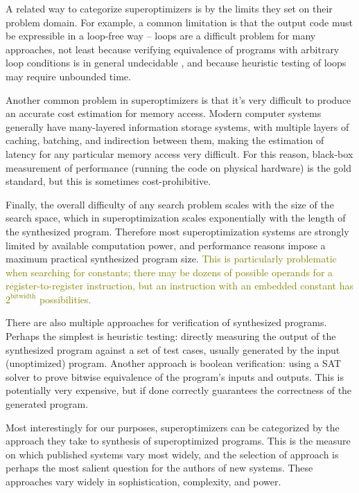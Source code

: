 \documentclass[12pt,twoside]{reedthesis}
\newcommand{\green}[1]{\textcolor{olive}{#1}}
\begin{document}
    A related way to categorize superoptimizers is by the limits they set on their problem domain.
    For example, a common limitation is that the output code must be expressible in a loop-free way
        -- loops are a difficult problem for many approaches,
            not least because verifying equivalence of programs with arbitrary loop conditions is in general undecidable \cite{turing1937tm} \cite{sipser2012computation},
            and because heuristic testing of loops may require unbounded time.

    Another common problem in superoptimizers is that it's very difficult to produce an accurate cost estimation for memory access.
        Modern computer systems generally have many-layered information storage systems, with multiple layers of caching, batching, and indirection between them, making the estimation of latency for any particular memory access very difficult.
        For this reason, black-box measurement of performance (running the code on physical hardware) is the gold standard, but this is sometimes cost-prohibitive.

    Finally, the overall difficulty of any search problem scales with the size of the search space, which in superoptimization scales exponentially with the length of the synthesized program.
    Therefore most superoptimization systems are strongly limited by available computation power, and performance reasons impose a maximum practical synthesized program size.
    \green{This is particularly problematic when searching for constants; there may be dozens of possible operands for a register-to-register instruction, but an instruction with an embedded constant has $2^\text{bitwidth}$ possibilities. }
    
    There are also multiple approaches for verification of synthesized programs.
    Perhaps the simplest is heuristic testing: 
        directly measuring the output of the synthesized program against a set of test cases, usually generated by the input (unoptimized) program.
    Another approach is boolean verification: using a SAT solver to prove bitwise equivalence of the program's inputs and outputs.
    This is potentially very expensive, but if done correctly guarantees the correctness of the generated program. 
    
    Most interestingly for our purposes, superoptimizers can be categorized by the approach they take to synthesis of superoptimized programs.
    This is the measure on which published systems vary most widely, and the selection of approach is perhaps the most salient question for the authors of new systems.
    These approaches vary widely in sophistication, complexity, and power.
    
\end{document}
